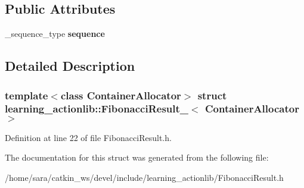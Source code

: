 \subsection*{Public Attributes}
\begin{DoxyCompactItemize}
\item 
\mbox{\label{structlearning__actionlib_1_1FibonacciResult___a6d7bedee565896778d61070afa58186b}} 
\+\_\+sequence\+\_\+type {\bfseries sequence}
\end{DoxyCompactItemize}


\subsection{Detailed Description}
\subsubsection*{template$<$class Container\+Allocator$>$\newline
struct learning\+\_\+actionlib\+::\+Fibonacci\+Result\+\_\+$<$ Container\+Allocator $>$}



Definition at line 22 of file Fibonacci\+Result.\+h.



The documentation for this struct was generated from the following file\+:\begin{DoxyCompactItemize}
\item 
/home/sara/catkin\+\_\+ws/devel/include/learning\+\_\+actionlib/Fibonacci\+Result.\+h\end{DoxyCompactItemize}
